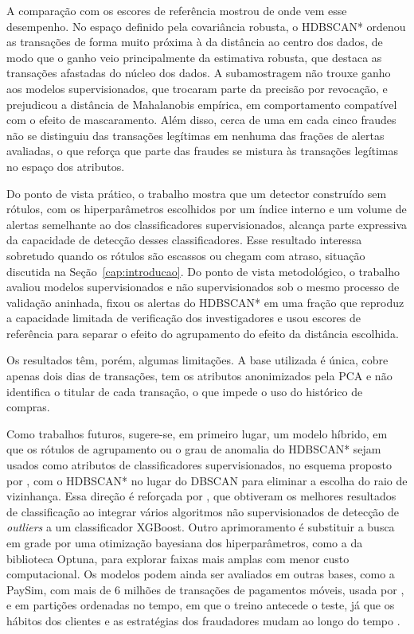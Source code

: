 \documentclass{uflamon}          %
\begin{document}
A comparação com os escores de referência mostrou de onde vem esse desempenho. No espaço definido pela covariância robusta, o HDBSCAN* ordenou as transações de forma muito próxima à da distância ao centro dos dados, de modo que o ganho veio principalmente da estimativa robusta, que destaca as transações afastadas do núcleo dos dados. A subamostragem não trouxe ganho aos modelos supervisionados, que trocaram parte da precisão por revocação, e prejudicou a distância de Mahalanobis empírica, em comportamento compatível com o efeito de mascaramento. Além disso, cerca de uma em cada cinco fraudes não se distinguiu das transações legítimas em nenhuma das frações de alertas avaliadas, o que reforça que parte das fraudes se mistura às transações legítimas no espaço dos atributos.

Do ponto de vista prático, o trabalho mostra que um detector construído sem rótulos, com os hiperparâmetros escolhidos por um índice interno e um volume de alertas semelhante ao dos classificadores supervisionados, alcança parte expressiva da capacidade de detecção desses classificadores. Esse resultado interessa sobretudo quando os rótulos são escassos ou chegam com atraso, situação discutida na Seção~\ref{cap:introducao}. Do ponto de vista metodológico, o trabalho avaliou modelos supervisionados e não supervisionados sob o mesmo processo de validação aninhada, fixou os alertas do HDBSCAN* em uma fração que reproduz a capacidade limitada de verificação dos investigadores e usou escores de referência para separar o efeito do agrupamento do efeito da distância escolhida.

Os resultados têm, porém, algumas limitações. A base utilizada é única, cobre apenas dois dias de transações, tem os atributos anonimizados pela PCA e não identifica o titular de cada transação, o que impede o uso do histórico de compras.

Como trabalhos futuros, sugere-se, em primeiro lugar, um modelo híbrido, em que os rótulos de agrupamento ou o grau de anomalia do HDBSCAN* sejam usados como atributos de classificadores supervisionados, no esquema proposto por , com o HDBSCAN* no lugar do DBSCAN para eliminar a escolha do raio de vizinhança. Essa direção é reforçada por , que obtiveram os melhores resultados de classificação ao integrar vários algoritmos não supervisionados de detecção de \textit{outliers} a um classificador XGBoost. Outro aprimoramento é substituir a busca em grade por uma otimização bayesiana dos hiperparâmetros, como a da biblioteca Optuna, para explorar faixas mais amplas com menor custo computacional. Os modelos podem ainda ser avaliados em outras bases, como a PaySim, com mais de 6 milhões de transações de pagamentos móveis, usada por , e em partições ordenadas no tempo, em que o treino antecede o teste, já que os hábitos dos clientes e as estratégias dos fraudadores mudam ao longo do tempo \cite{dalpozzolo2018}.
\end{document}
